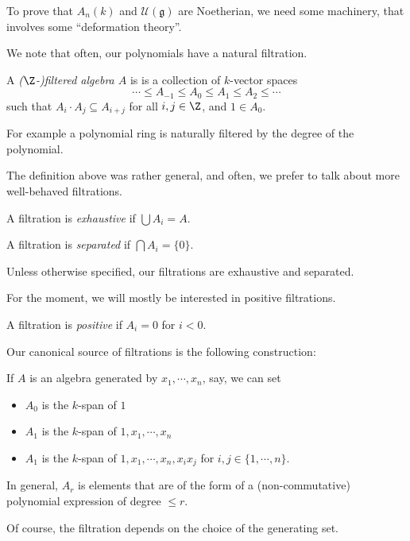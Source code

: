 \documentclass[a4paper]{article}
\begin{document}
To prove that $A_n(k)$ and $\mathcal{U}(\mathfrak{g})$ are Noetherian, we need some machinery, that involves some ``deformation theory''.

We note that often, our polynomials have a natural filtration.
\begin{defi}
  A \emph{($\Z$-)filtered algebra $A$} is is a collection of $k$-vector spaces
  \[
    \cdots \leq A_{-1} \leq A_0 \leq A_1 \leq A_2 \leq \cdots
  \]
  such that $A_i \cdot A_j \subseteq A_{i + j}$ for all $i, j \in \Z$, and $1 \in A_0$.
\end{defi}
For example a polynomial ring is naturally filtered by the degree of the polynomial.

The definition above was rather general, and often, we prefer to talk about more well-behaved filtrations.
\begin{defi}
  A filtration is \emph{exhaustive} if $\bigcup A_i = A$.
\end{defi}

\begin{defi}
  A filtration is \emph{separated} if $\bigcap A_i = \{0\}$.
\end{defi}
Unless otherwise specified, our filtrations are exhaustive and separated.

For the moment, we will mostly be interested in positive filtrations.

\begin{defi}
  A filtration is \emph{positive} if $A_i = 0$ for $i < 0$.
\end{defi}

Our canonical source of filtrations is the following construction:
\begin{eg}
  If $A$ is an algebra generated by $x_1, \cdots, x_n$, say, we can set
  \begin{itemize}
    \item $A_0$ is the $k$-span of $1$
    \item $A_1$ is the $k$-span of $1, x_1, \cdots, x_n$
    \item $A_1$ is the $k$-span of $1, x_1, \cdots, x_n, x_i x_j$ for $i, j \in \{1, \cdots, n\}$.
  \end{itemize}
  In general, $A_r$ is elements that are of the form of a (non-commutative) polynomial expression of degree $\leq r$.
\end{eg}
Of course, the filtration depends on the choice of the generating set.
\end{document}
